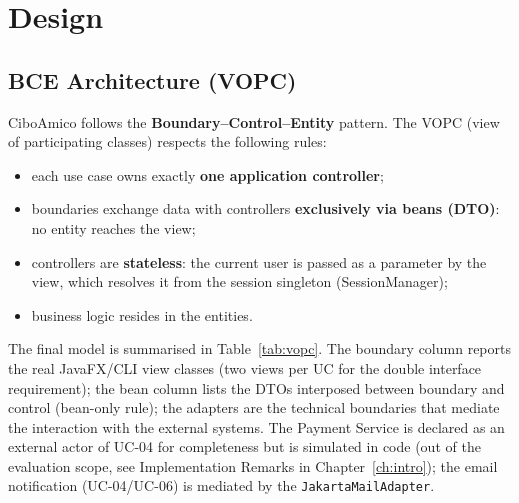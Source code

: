 \chapter{Design}\label{ch:design}

\section{BCE Architecture (VOPC)}

CiboAmico follows the \textbf{Boundary--Control--Entity} pattern. The VOPC
(view of participating classes) respects the following rules:
\begin{itemize}
    \item each use case owns exactly \textbf{one application controller};
    \item boundaries exchange data with controllers \textbf{exclusively via
    beans (DTO)}: no entity reaches the view;
    \item controllers are \textbf{stateless}: the current user is passed as a
    parameter by the view, which resolves it from the session singleton
    (SessionManager);
    \item business logic resides in the entities.
\end{itemize}

The final model is summarised in Table~\ref{tab:vopc}. The boundary
column reports the real JavaFX/CLI view classes (two views per UC for the
double interface requirement); the bean column lists the DTOs
interposed between boundary and control (bean-only rule); the adapters are
the technical boundaries that mediate the interaction with the external
systems. The Payment Service is declared as an external actor of UC-04 for
completeness but is simulated in code (out of the evaluation scope, see
Implementation Remarks in Chapter~\ref{ch:intro}); the email notification
(UC-04/UC-06) is mediated by the \texttt{JakartaMailAdapter}.

